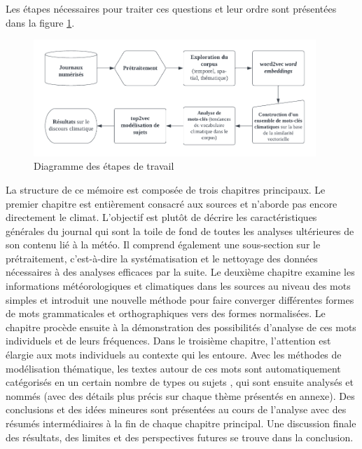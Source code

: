 \documentclass[a4paper,twoside,12pt]{article}
\begin{document}
Les étapes nécessaires pour traiter ces questions et leur ordre sont présentées dans la figure \ref{fig:workflow}.

\begin{figure}[h]
    \centering
    \includegraphics[width=0.95\textwidth]{images/workflow_FR.pdf}
    \caption{Diagramme des étapes de travail}
    \label{fig:workflow}
\end{figure}


La structure de ce mémoire est composée de trois chapitres principaux. Le premier chapitre est entièrement consacré aux sources et n'aborde pas encore directement le climat. L'objectif est plutôt de décrire les caractéristiques générales du journal qui sont la toile de fond de toutes les analyses ultérieures de son contenu lié à la météo. Il comprend également une sous-section sur le prétraitement, c'est-à-dire la systématisation et le nettoyage des données nécessaires à des analyses efficaces par la suite. Le deuxième chapitre examine les informations météorologiques et climatiques dans les sources au niveau des mots simples et introduit une nouvelle méthode pour faire converger différentes formes de mots grammaticales et orthographiques vers des formes normalisées. Le chapitre procède ensuite à la démonstration des possibilités d'analyse de ces mots individuels et de leurs fréquences. Dans le troisième chapitre, l'attention est élargie aux mots individuels au contexte qui les entoure. Avec les méthodes de modélisation thématique, les textes autour de ces mots sont automatiquement catégorisés en un certain nombre de types ou \og sujets \fg{}, qui sont ensuite analysés et nommés (avec des détails plus précis sur chaque thème présentés en annexe). Des conclusions et des idées mineures sont présentées au cours de l'analyse avec des résumés intermédiaires à la fin de chaque chapitre principal. Une discussion finale des résultats, des limites et des perspectives futures se trouve dans la conclusion.

\medskip
\end{document}
